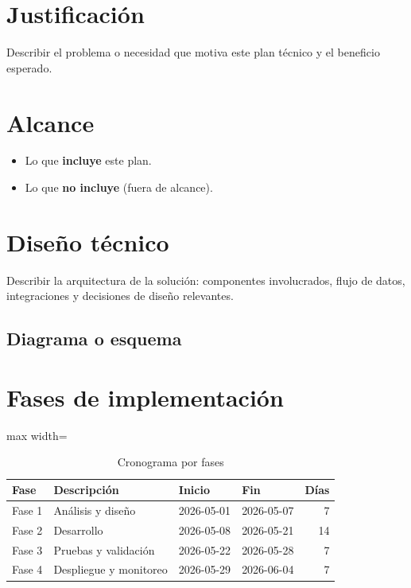 \documentclass{../base/canon}
\begin{document}
\section{Justificación}

\begin{ParrafoEjecutivo}
Describir el problema o necesidad que motiva este plan técnico y el beneficio esperado.
\end{ParrafoEjecutivo}

\section{Alcance}

\begin{itemize}
  \item Lo que \textbf{incluye} este plan.
  \item Lo que \textbf{no incluye} (fuera de alcance).
\end{itemize}

\section{Diseño técnico}

\begin{ParrafoMetodologico}
Describir la arquitectura de la solución: componentes involucrados, flujo de datos,
integraciones y decisiones de diseño relevantes.
\end{ParrafoMetodologico}

\subsection{Diagrama o esquema}


\section{Fases de implementación}

\begin{table}[H]
  \centering
  \caption{Cronograma por fases}
  \begin{adjustbox}{max width=\linewidth}
  \begin{tabular}{l l l l r}
    \toprule
    \textbf{Fase} & \textbf{Descripción} & \textbf{Inicio} & \textbf{Fin} & \textbf{Días} \\
    \midrule
    Fase 1 & Análisis y diseño         & 2026-05-01 & 2026-05-07  & 7  \\
    Fase 2 & Desarrollo                & 2026-05-08 & 2026-05-21  & 14 \\
    Fase 3 & Pruebas y validación      & 2026-05-22 & 2026-05-28  & 7  \\
    Fase 4 & Despliegue y monitoreo    & 2026-05-29 & 2026-06-04  & 7  \\
    \bottomrule
  \end{tabular}
  \end{adjustbox}
\end{table}
\end{document}
